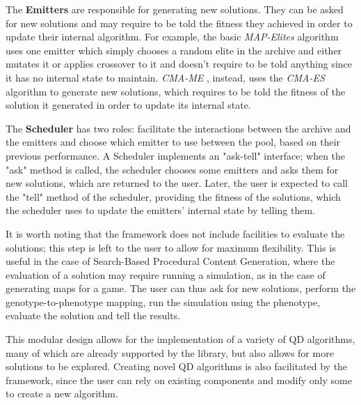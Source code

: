 The \textbf{Emitters} are responsible for generating new solutions. They can be asked for new solutions and may require to be told the fitness they achieved in order to update their internal algorithm. 
For example, the basic \textit{MAP-Elites} \cite{mouret_illuminating_2015} algorithm uses one emitter which simply chooses a random elite in the archive and either mutates it or applies crossover to it and doesn't require to be told anything since it has no internal state to maintain. 
\textit{CMA-ME} \cite{fontaine_covariance_2020}, instead, uses the \textit{CMA-ES} algorithm to generate new solutions, which requires to be told the fitness of the solution it generated in order to update its internal state.

The \textbf{Scheduler} has two roles: facilitate the interactions between the archive and the emitters and choose which emitter to use between the pool, based on their previous performance.
A Scheduler implements an "ask-tell" interface; when the "ask" method is called, the scheduler chooses some emitters and asks them for new solutions, which are returned to the user. Later, the user is expected to call the "tell" method of the scheduler, providing the fitness of the solutions, which the scheduler uses to update the emitters' internal state by telling them.

It is worth noting that the framework does not include facilities to evaluate the solutions; this step is left to the user to allow for maximum flexibility. This is useful in the case of Search-Based Procedural Content Generation, where the evaluation of a solution may require running a simulation, as in the case of generating maps for a game. The user can thus ask for new solutions, perform the genotype-to-phenotype mapping, run the simulation using the phenotype, evaluate the solution and tell the results. 

This modular design allows for the implementation of a variety of QD algorithms, many of which are already supported by the library, but also allows for more solutions to be explored. Creating novel QD algorithms is also facilitated by the framework, since the user can rely on existing components and modify only some to create a new algorithm.

